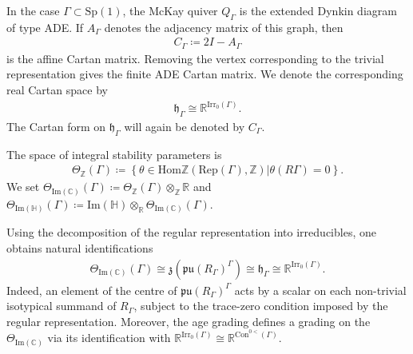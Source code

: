 \documentclass[psamsfonts]{amsart}
\theoremstyle{plain}
\theoremstyle{definition}{
\newtheorem{defi}{Definition}[section]
\newtheorem{ass}{Assumption}
\newtheorem*{nota}{Notation}}
\theoremstyle{remark}{
\newtheorem{rem}{Remark}
\newtheorem{ex}{Example}}
\theoremstyle{plain}{
\newtheorem{thm}{Theorem}[section]
\newtheorem{lem}{Lemma}[section]
\newtheorem{cor}{Corollary}[section]
\newtheorem{prop}{Proposition}[section]
\newtheorem{con}{Conjecture}[section]}
\newcommand{\m}[1]{{\mathrm{#1}}}
\begin{document}
In the case $\Gamma\subset \m{Sp}(1)$, the McKay quiver $Q_\Gamma$ is the extended Dynkin diagram of type ADE. If $A_\Gamma$ denotes
the adjacency matrix of this graph, then
\begin{align*}
C_\Gamma\coloneqq 2I-A_\Gamma
\end{align*}
is the affine Cartan matrix. Removing the vertex corresponding to the trivial representation gives the finite ADE Cartan matrix. We denote the corresponding real Cartan space by
\begin{align*}
    \mathfrak{h}_\Gamma\cong\mathbb{R}^{\m{Irr}_0(\Gamma)}.
\end{align*}
The Cartan form on $\mathfrak{h}_\Gamma$ will again be denoted by $C_\Gamma$.

\begin{defi}
The space of integral stability parameters is
\begin{align*}
    \Theta_{\mathbb{Z}}(\Gamma)\coloneqq\left\{\theta\in \m{Hom}{\mathbb{Z}}(\m{Rep}(\Gamma),\mathbb{Z})|\theta(R\Gamma)=0\right\}.
\end{align*}
We set $\Theta_{\m{Im}(\mathbb{C})}(\Gamma)
\coloneqq \Theta_{\mathbb{Z}}(\Gamma)\otimes_{\mathbb{Z}}\mathbb{R}$ and $\Theta_{\m{Im}(\mathbb{H})}(\Gamma)
\coloneqq \m{Im}(\mathbb{H})\otimes_{\mathbb{R}}\Theta_{\m{Im}(\mathbb{C})}(\Gamma)$.
\end{defi}

Using the decomposition of the regular representation into irreducibles, one obtains natural identifications
\begin{align*}
\Theta_{\m{Im}(\mathbb{C})}(\Gamma)
\cong\mathfrak{z}(\mathfrak{pu}(R_\Gamma)^\Gamma)\cong\mathfrak{h}_\Gamma
\cong\mathbb{R}^{\m{Irr}_0(\Gamma)} .
\end{align*}
Indeed, an element of the centre of $\mathfrak{pu}(R_\Gamma)^\Gamma$ acts by a scalar on each non-trivial isotypical summand of $R_\Gamma$, subject to the trace-zero condition imposed by the regular representation. Moreover, the age grading defines a grading on the $\Theta_{\m{Im}(\mathbb{C})}$ via its identification with $\mathbb{R}^{\m{Irr}_0(\Gamma)}\cong \mathbb{R}^{\m{Con}^{0<}(\Gamma)}$.\\
\end{document}
